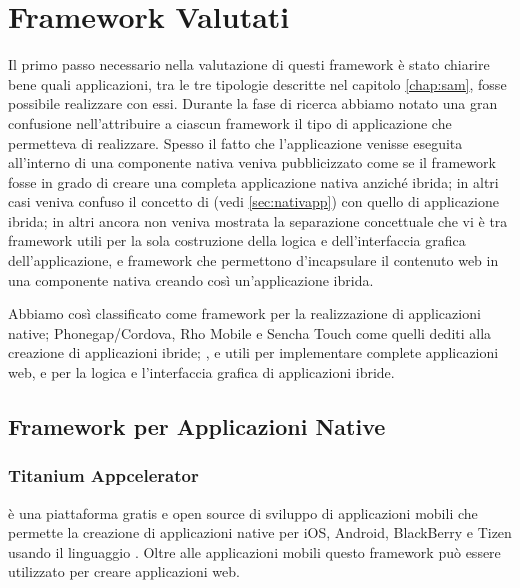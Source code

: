 \chapter{Framework Valutati}
    Il primo passo necessario nella valutazione di questi frame\-work è stato
    chiarire bene quali applicazioni, tra le tre tipologie descritte nel
    capitolo \ref{chap:sam}, fosse possibile realizzare con essi.
    Durante la fase di ricerca abbiamo
    notato una gran confusione nell'attribuire a ciascun frame\-work il tipo di
    applicazione che permetteva di realizzare. Spesso il fatto che
    l'applicazione venisse eseguita all'interno di una componente nativa veniva
    pubblicizzato come se il frame\-work fosse in grado di creare una completa
    applicazione nativa anziché ibrida; in altri casi
    veniva confuso il concetto di \crosscomp{} (vedi \ref{sec:nativapp}) con
    quello di
    applicazione ibrida; in altri ancora non veniva mostrata la separazione
    concettuale che vi è tra frame\-work utili per la sola costruzione della
    logica e dell'interfaccia grafica dell'applicazione, e frame\-work che
    permettono d'incapsulare il contenuto web in una componente nativa creando
    così un'applicazione ibrida.

    Abbiamo così classificato \tisdk{} come frame\-work per la
    realizzazione di applicazioni native; Phonegap/Cordova, Rho Mobile e Sencha
    Touch come quelli dediti alla creazione di applicazioni ibride; \jqm{},
    \kendomob{} e \phonejs{} utili per implementare complete
    applicazioni web, e per la logica e l'interfaccia grafica di applicazioni
    ibride.

    \section{Framework per Applicazioni Native}
        \subsection{Titanium Appcelerator}
        \label{sec:titanium}
            \tisdk{} è una piattaforma gratis e open \mbox{source} di sviluppo di
            applicazioni mobili che permette la creazione di applicazioni native
            \crossplat{} per iOS, Android, BlackBerry e Tizen usando il
            linguaggio \js{}. Oltre alle applicazioni mobili questo frame\-work
            può essere utilizzato per creare applicazioni web.

